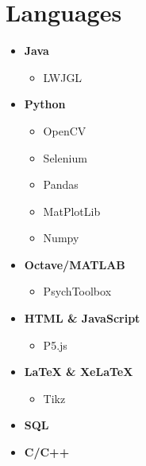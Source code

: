 \documentclass[]{chandan-cv}
\begin{document}
\begin{minipage}[t]{0.33\textwidth} 


\section{Languages}
	\begin{itemize}
		\setlength\itemsep{0em}
		\item \textbf{Java}
			\begin{itemize}
				\setlength\itemsep{0em}
				\item LWJGL
			\end{itemize}
		\item \textbf{Python}
			\begin{itemize}
				\setlength\itemsep{0em}
				\item OpenCV
				\item Selenium
				\item Pandas
				\item MatPlotLib
				\item Numpy
			\end{itemize}
		\item \textbf{Octave/MATLAB}
			\begin{itemize}
				\setlength\itemsep{0em}
				\item PsychToolbox
			\end{itemize}
		\item \textbf{HTML \& JavaScript}
			\begin{itemize}
				\setlength\itemsep{0em}
				\item P5.js
			\end{itemize}
		\item \textbf{LaTeX \& XeLaTeX}
			\begin{itemize}
				\setlength\itemsep{0em}
				\item Tikz
			\end{itemize}
		\item \textbf{SQL}
		\item \textbf{C/C++}
	\end{itemize}
\sectionsep



\end{minipage}
\end{document}
